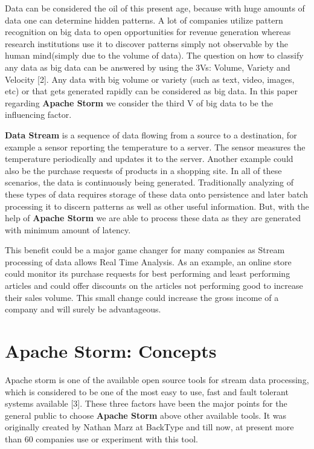 \documentclass[runningheads,a4paper]{llncs}[2015/06/24]
\begin{document}
Data can be considered the oil of this present age, because with huge amounts of data one can determine hidden patterns. A lot of companies utilize pattern recognition on big data to open opportunities for revenue generation whereas research institutions use it to discover patterns simply not observable by the human mind(simply due to the volume of data). The question on how to classify any data as big data can be answered by using the 3Vs: Volume, Variety and Velocity [2]. Any data with big volume or variety (such as text, video, images, etc) or that gets generated rapidly can be considered as big data. In this paper regarding \textbf{Apache Storm} we consider the third V of big data to be the influencing factor.

\textbf{Data Stream} is a sequence of data flowing from a source to a destination, for example a sensor reporting the temperature to a server. The sensor measures the temperature periodically and updates it to the server. Another example could also be the purchase requests of products in a shopping site. In all of these scenarios, the data is continuously being generated. Traditionally analyzing of these types of data requires storage of these data onto persistence and later batch processing it to discern patterns as well as other useful information. But, with the help of \textbf{Apache Storm} we are able to process these data as they are generated with minimum amount of latency.

This benefit could be a major game changer for many companies as Stream processing of data allows Real Time Analysis. As an example, an online store could monitor its purchase requests for best performing and least performing articles and could offer discounts on the articles not performing good to increase their sales volume. This small change could increase the gross income of a company and will surely be advantageous.

\section{Apache Storm: Concepts}
\label{sec:concepts}

Apache storm is one of the available open source tools for stream data processing, which is considered to be one of the most easy to use, fast and fault tolerant systems available [3]. These three factors have been the major points for the general public to choose \textbf{Apache Storm} above other available tools. It was originally created by Nathan Marz at BackType and till now, at present more than 60 companies use or experiment with this tool.
\end{document}
